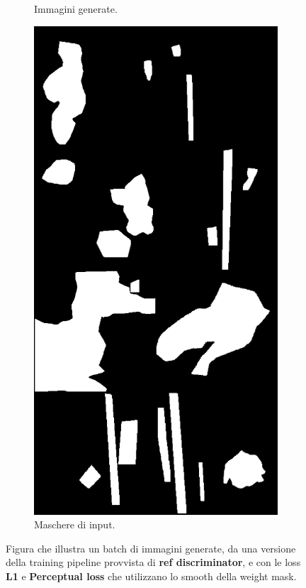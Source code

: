 \begin{figure}[htpb]
\begin{subfigure}[b]{0.3\textwidth}
        \caption{Immagini generate.}
        \label{fig:good_example_2}
    \end{subfigure}
    \hfill
    \begin{subfigure}[b]{0.3\textwidth}
        \includegraphics[width=\textwidth]{imgs/Coigan/results/buone/media_images_union_shapes_210000_00bedf5aec801c9d519d.png}
        \caption{Maschere di input.}
        \label{fig:good_example_3}
    \end{subfigure}
    \caption{Figura che illustra un batch di immagini generate, da una versione della training pipeline provvista di
    \textbf{ref discriminator}, e con le loss \textbf{L1} e \textbf{Perceptual loss} che utilizzano lo smooth della weight mask.}
    \label{fig:good_example}
\end{figure}

